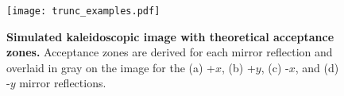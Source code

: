 \begin{figure}
\centering
\texttt{[image: trunc\_examples.pdf]}
\caption{\textbf{Simulated kaleidoscopic image with theoretical acceptance zones.} 
Acceptance zones are derived for each mirror reflection and overlaid in gray on 
the image for the (a) +$x$, (b) +$y$, (c) -$x$, and (d) -$y$ mirror reflections.} 
\label{fig:trunc_examples}
\end{figure}